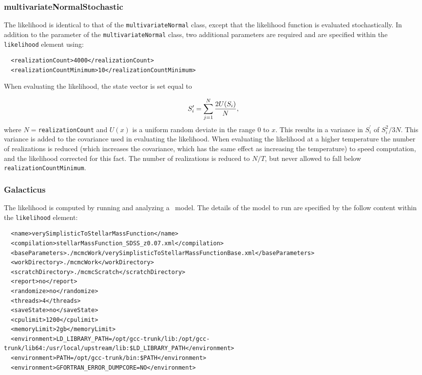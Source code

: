 \subsubsection{multivariateNormalStochastic}

The likelihood is identical to that of the {\tt multivariateNormal} class, except that the likelihood function is evaluated stochastically. In addition to the parameter of the {\tt multivariateNormal} class, two additional parameters are required and are specified within the {\tt likelihood} element using:
\begin{verbatim}
  <realizationCount>4000</realizationCount>
  <realizationCountMinimum>10</realizationCountMinimum>
\end{verbatim}
When evaluating the likelihood, the state vector is set equal to 

\begin{equation}
 S^\prime_i = \sum_{j=1}^N {2 U(S_i) \over N},
\end{equation}
where $N=${\tt realizationCount} and $U(x)$ is a uniform random deviate in the range $0$ to $x$. This results in a variance in $S^\prime_i$ of $S_i^2/3N$. This variance is added to the covariance used in evaluating the likelihood. When evaluating the likelihood at a higher temperature the number of realizations is reduced (which increases the covariance, which has the same effect as increasing the temperature) to speed computation, and the likelihood corrected for this fact. The number of realizations is reduced to $N/T$, but never allowed to fall below {\tt realizationCountMinimum}.

\subsubsection{Galacticus}

The likelihood is computed by running and analyzing a \glc\ model. The details of the model to run are specified by the follow content within the {\tt likelihood} element:
\begin{verbatim}
  <name>verySimplisticToStellarMassFunction</name>
  <compilation>stellarMassFunction_SDSS_z0.07.xml</compilation>
  <baseParameters>./mcmcWork/verySimplisticToStellarMassFunctionBase.xml</baseParameters>
  <workDirectory>./mcmcWork</workDirectory>
  <scratchDirectory>./mcmcScratch</scratchDirectory>
  <report>no</report>
  <randomize>no</randomize>
  <threads>4</threads>
  <saveState>no</saveState>
  <cpulimit>1200</cpulimit>
  <memoryLimit>2gb</memoryLimit>
  <environment>LD_LIBRARY_PATH=/opt/gcc-trunk/lib:/opt/gcc-trunk/lib64:/usr/local/upstream/lib:$LD_LIBRARY_PATH</environment>
  <environment>PATH=/opt/gcc-trunk/bin:$PATH</environment>
  <environment>GFORTRAN_ERROR_DUMPCORE=NO</environment>
\end{verbatim}

